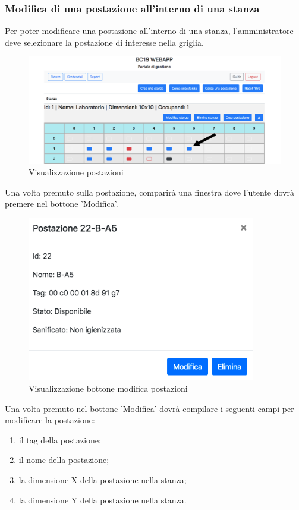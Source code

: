 \subsubsection{Modifica di una postazione all'interno di una stanza}
Per poter modificare una postazione all'interno di una stanza, l'amministratore deve selezionare la postazione di interesse nella griglia.
\begin{figure}[H]
	\centering
	\includegraphics[width=15cm]{res/images/postDaEliminare.png}
	\caption{Visualizzazione postazioni}
\end{figure}
Una volta premuto sulla postazione, comparirà una finestra dove l'utente dovrà premere nel bottone 'Modifica'.
\begin{figure}[H]
	\centering
	\includegraphics[width=10cm]{res/images/bottoneCestinoWorkstation.png}
	\caption{Visualizzazione bottone modifica postazioni}
\end{figure}
Una volta premuto nel bottone 'Modifica' dovrà compilare i seguenti campi per modificare la postazione:
\begin{enumerate}
	\item il tag della postazione;
	\item il nome della postazione;
	\item la dimensione X della postazione nella stanza;
	\item la dimensione Y della postazione nella stanza.
\end{enumerate}
